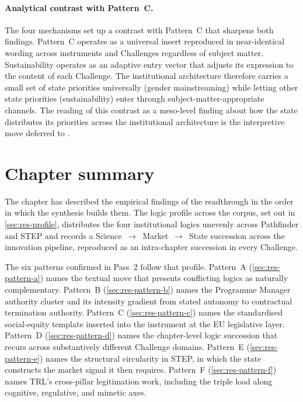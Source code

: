 \paragraph{Analytical contrast with Pattern~C.}
The four mechanisms set up a contrast with Pattern~C that sharpens
both findings. Pattern~C operates as a universal insert reproduced
in near-identical wording across instruments and Challenges
regardless of subject matter. Sustainability operates as an adaptive
entry vector that adjusts its expression to the content of each
Challenge. The institutional architecture therefore carries a small
set of state priorities universally (gender mainstreaming) while
letting other state priorities (sustainability) enter through
subject-matter-appropriate channels. The reading of this contrast as
a meso-level finding about how the state distributes its priorities
across the institutional architecture is the interpretive move
deferred to .

\section{Chapter summary}
\label{sec:res-summary}

The chapter has described the empirical findings of the readthrough
in the order in which the synthesis builds them. The logic profile
across the corpus, set out in \cref{sec:res-profile}, distributes the
four institutional logics unevenly across Pathfinder and STEP and
records a Science~$\to$~Market~$\to$~State succession across the
innovation pipeline, reproduced as an intra-chapter succession in
every Challenge.

The six patterns confirmed in Pass~2 follow that profile. Pattern~A
(\cref{sec:res-pattern-a}) names the textual move that presents
conflicting logics as naturally complementary. Pattern~B
(\cref{sec:res-pattern-b}) names the Programme Manager authority
cluster and its intensity gradient from stated autonomy to
contractual termination authority. Pattern~C
(\cref{sec:res-pattern-c}) names the standardised social-equity
template inserted into the instrument at the EU legislative layer.
Pattern~D (\cref{sec:res-pattern-d}) names the chapter-level logic
succession that recurs across substantively different Challenge
domains. Pattern~E (\cref{sec:res-pattern-e}) names the structural
circularity in STEP, in which the state constructs the market signal
it then requires. Pattern~F (\cref{sec:res-pattern-f}) names TRL's
cross-pillar legitimation work, including the triple load along
cognitive, regulative, and mimetic axes.

